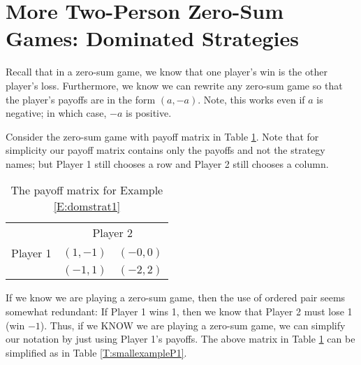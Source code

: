 
\section{More Two-Person Zero-Sum Games: Dominated Strategies}





Recall that in a zero-sum game, we know that one player's win is the other player's loss. Furthermore, we know we can rewrite any zero-sum game so that the player's payoffs are in the form $(a, -a)$. Note, this works even if $a$ is negative; in which case, $-a$ is positive.

\begin{example}\label{E:domstrat1} Consider the zero-sum game with payoff matrix in Table \ref{T:smallexample}. Note that for simplicity our payoff matrix contains only the payoffs and not the strategy names; but Player 1 still chooses a row and Player 2 still chooses a column.



\begin{table}[h]
\centering

\begin{tabular}{ccc}
                      & \multicolumn{2}{c}{Player 2}                                                  \\ \cline{2-3} 
\multicolumn{1}{l|}{Player 1}  & \multicolumn{1}{c|}{$(1, -1)$} & \multicolumn{1}{c|}{$(-0, 0)$} \\ \cline{2-3} 
\multicolumn{1}{l|}{}  & \multicolumn{1}{c|}{$(-1, 1)$} & \multicolumn{1}{c|}{$(-2, 2)$} \\ \cline{2-3} 
\end{tabular}
\caption{The payoff matrix for Example \ref{E:domstrat1}}
\label{T:smallexample}
\end{table}


If we know we are playing a zero-sum game, then the use of ordered pair seems somewhat redundant: If Player 1 wins 1, then we know that Player 2 must lose 1 (win $-1$). Thus, if we KNOW we are playing a zero-sum game, we can simplify our notation by just using Player 1's payoffs. The above matrix in Table \ref{T:smallexample} can be simplified as in Table \ref{T:smallexampleP1}.


\end{example}
